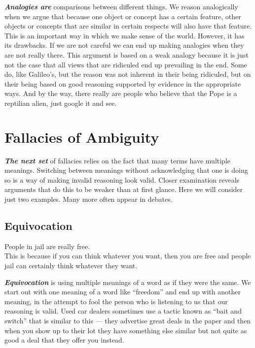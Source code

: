 \documentclass[12pt, openany]{book}
\begin{document}
\textbf{\emph{Analogies are}} comparisons between different things. We reason analogically when we argue that because one object or concept has a certain feature, other objects or concepts that are similar in certain respects will also have that feature. This is an important way in which we make sense of the world. However, it has its drawbacks. If we are not careful we can end up making analogies when they are not really there. This argument is based on a weak analogy because it is just not the case that all views that are ridiculed end up prevailing in the end. Some do, like Galileo's, but the reason was not inherent in their being ridiculed, but on their being based on good reasoning supported by evidence in the appropriate ways. And by the way, there really are people who believe that the Pope is a reptilian alien, just google it and see.

\hypertarget{ambiguity}{%
\section{Fallacies of Ambiguity}\label{ambiguity}}

\textbf{\emph{The next set}} of fallacies relies on the fact that many terms have multiple meanings. Switching between meanings without acknowledging that one is doing so is a way of making invalid reasoning look valid. Closer examination reveals arguments that do this to be weaker than at first glance. Here we will consider just two examples. Many more often appear in debates.

\hypertarget{equivocation}{%
\subsection*{Equivocation}\label{equivocation}}


\begin{center}

\begin{argument}

People in jail are really free.\\

This is because if you can think whatever you want, then you are free and people jail can certainly think whatever they want.

\end{argument}

\end{center}

\textbf{\emph{Equivocation}} is using multiple meanings of a word as if they were the same. We start out with one meaning of a word like ``freedom'' and end up with another meaning, in the attempt to fool the person who is listening to us that our reasoning is valid. Used car dealers sometimes use a tactic known as ``bait and switch'' that is similar to this --- they advertise great deals in the paper and then when you show up to their lot they have something else similar but not quite as good a deal that they offer you instead.
\end{document}
